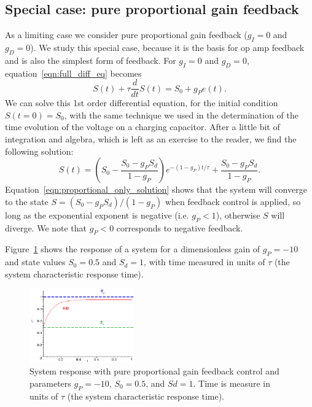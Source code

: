 \documentclass{article}
\begin{document}
\subsection{Special case: pure proportional gain feedback}
As a limiting case we consider pure proportional gain feedback ($g_I = 0$ and $g_D = 0$). We study this special case, because it is the basis for op amp feedback and is also the simplest form of feedback. For $g_I = 0$ and $g_D = 0$, equation~\ref{eqn:full_diff_eq} becomes
\begin{equation}
S(t) + \tau \frac{d}{dt} S(t) = S_0 + g_P e(t). \label{eqn:proportional_only_diff_eq}
\end{equation}
We can solve this 1st order differential equation, for the initial condition $S(t=0) = S_0$, with the same technique we used in the determination of the time evolution of the voltage on a charging capacitor. After a little bit of integration and algebra, which is left as an exercise to the reader, we find the following solution:
\begin{equation}
S(t) = \left(S_0 - \frac{S_0 - g_P S_d}{1 - g_P}\right) e^{-(1-g_P)t/\tau} + \frac{S_0 - g_P S_d}{1 - g_P}. \label{eqn:proportional_only_solution}
\end{equation}
Equation~\ref{eqn:proportional_only_solution} shows that the system will converge to the state $S = (S_0 - g_P S_d) / (1 - g_P)$ when feedback control is applied, so long as the exponential exponent is negative (i.e. $g_P < 1$), otherwise $S$ will diverge. We note that $g_P < 0$ corresponds to negative feedback.

Figure~\ref{fig:P_from_05_to_1} shows the response of a system for a dimensionless gain of $g_P = -10$ and state values $S_0 = 0.5$ and $S_d = 1$, with time measured in units of $\tau$ (the system characteristic response time).

\begin{figure}
\begin{center}
\includegraphics[width=0.4\textwidth]{pics/P_from_05_to_1}
\end{center}
\caption{System response with pure proportional gain feedback control and parameters $g_P = -10$, $S_0 = 0.5$, and $S d = 1$. Time is measure in units of $\tau$ (the system characteristic response time).}
\label{fig:P_from_05_to_1}
\end{figure}
\end{document}
